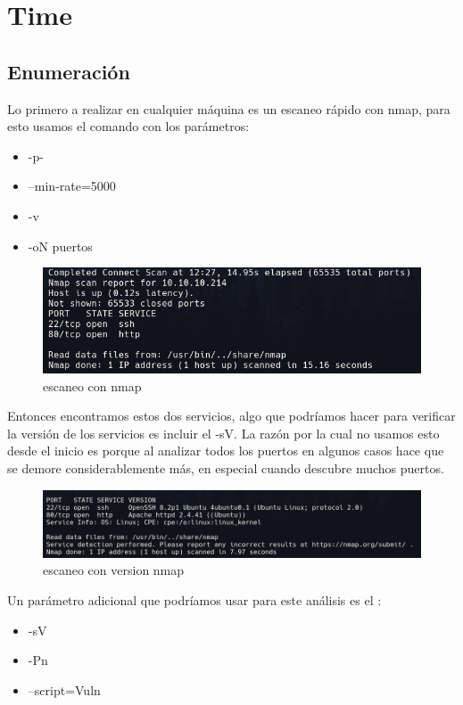 \documentclass{article}
\begin{document}


\clearpage
\tableofcontents
\clearpage
\section{Time}
\subsection{Enumeración}
Lo primero a realizar en cualquier máquina es un escaneo rápido con nmap, para esto usamos el comando con los parámetros:
\begin{itemize}
	\item -p-
	\item --min-rate=5000
	\item -v
	\item -oN puertos
\end{itemize}
\begin{figure}[H]
	\center
	\includegraphics[width=\textwidth]{images/time/nmap.png}
	\caption{escaneo con nmap}
\end{figure}
Entonces encontramos estos dos servicios, algo que podríamos hacer para verificar la versión de los servicios es incluir el -sV.
La razón por la cual no usamos esto desde el inicio es porque al analizar todos los puertos en algunos casos hace que se demore considerablemente más, en especial cuando descubre muchos puertos.
\begin{figure}[H]
	\center
	\includegraphics[width=\textwidth]{images/time/nmap_version.png}
	\caption{escaneo con version nmap}
\end{figure}
Un parámetro adicional que podríamos usar para este análisis es el :
\begin{itemize}
	\item -sV 
	\item -Pn 
	\item --script=Vuln
\end{itemize}
\end{document}
